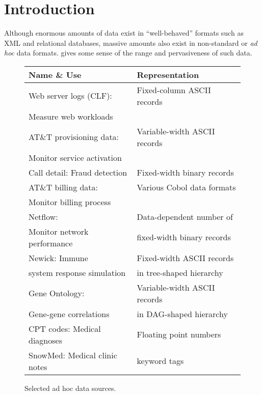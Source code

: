 \section{Introduction}
\label{section:intro}
Although enormous amounts of data exist in ``well-behaved'' formats such
as XML and relational databases, massive amounts also exist in
non-standard or \textit{ad hoc} data formats. 
gives some sense of the range and pervasiveness of such data.
\begin{figure}
\begin{center}
\begin{tabular}{l|l}
\hline
Name \& Use   &  Representation               \\ \hline
Web server logs (CLF):  &  Fixed-column ASCII records \\ 
Measure web workloads &                             \\ \hline
AT\&T provisioning data: & Variable-width ASCII records  \\ 
Monitor service activation &                              \\ \hline
Call detail: Fraud detection  &  Fixed-width binary records \\  \hline 
AT\&T billing data: & Various Cobol data formats  \\ 
Monitor billing process   &                             \\ \hline
Netflow:                        & Data-dependent number of     \\ 
Monitor network performance  & fixed-width binary records  \\ \hline
Newick:   Immune                 & Fixed-width ASCII records \\ 
system response simulation & in tree-shaped hierarchy\\ \hline                                
Gene Ontology:             & Variable-width ASCII records \\
Gene-gene correlations     & in DAG-shaped hierarchy \\ \hline
CPT codes: Medical diagnoses & Floating point numbers \\ \hline
SnowMed: Medical clinic notes & keyword tags  \\ 
\end{tabular}

\caption{Selected ad hoc data sources.}
\label{figure:data-sources}
\end{center}
\end{figure}
